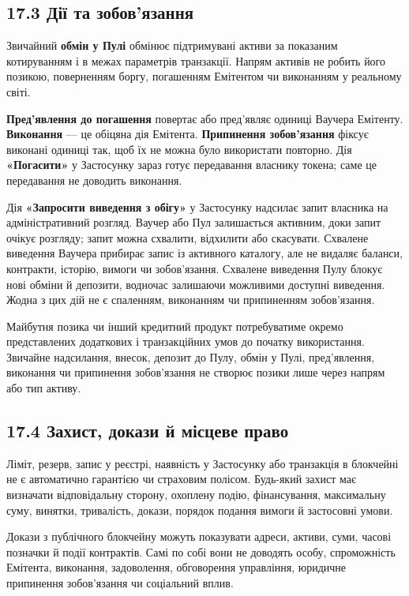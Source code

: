 \documentclass[11pt]{article}
\begin{document}
\subsection*{17.3 Дії та зобов'язання}

Звичайний \textbf{обмін у Пулі} обмінює підтримувані активи за показаним котируванням і в межах параметрів транзакції. Напрям активів не робить його позикою, поверненням боргу, погашенням Емітентом чи виконанням у реальному світі.

\textbf{Пред'явлення до погашення} повертає або пред'являє одиниці Ваучера Емітенту. \textbf{Виконання} --- це обіцяна дія Емітента. \textbf{Припинення зобов'язання} фіксує виконані одиниці так, щоб їх не можна було використати повторно. Дія \textbf{«Погасити»} у Застосунку зараз готує передавання власнику токена; саме це передавання не доводить виконання.

Дія \textbf{«Запросити виведення з обігу»} у Застосунку надсилає запит власника на адміністративний розгляд. Ваучер або Пул залишається активним, доки запит очікує розгляду; запит можна схвалити, відхилити або скасувати. Схвалене виведення Ваучера прибирає запис із активного каталогу, але не видаляє баланси, контракти, історію, вимоги чи зобов'язання. Схвалене виведення Пулу блокує нові обміни й депозити, водночас залишаючи можливими доступні виведення. Жодна з цих дій не є спаленням, виконанням чи припиненням зобов'язання.

Майбутня позика чи інший кредитний продукт потребуватиме окремо представлених додаткових і транзакційних умов до початку використання. Звичайне надсилання, внесок, депозит до Пулу, обмін у Пулі, пред'явлення, виконання чи припинення зобов'язання не створює позики лише через напрям або тип активу.

\subsection*{17.4 Захист, докази й місцеве право}

Ліміт, резерв, запис у реєстрі, наявність у Застосунку або транзакція в блокчейні не є автоматично гарантією чи страховим полісом. Будь-який захист має визначати відповідальну сторону, охоплену подію, фінансування, максимальну суму, винятки, тривалість, докази, порядок подання вимоги й застосовні умови.

Докази з публічного блокчейну можуть показувати адреси, активи, суми, часові позначки й події контрактів. Самі по собі вони не доводять особу, спроможність Емітента, виконання, задоволення, обговорення управління, юридичне припинення зобов'язання чи соціальний вплив.
\end{document}
